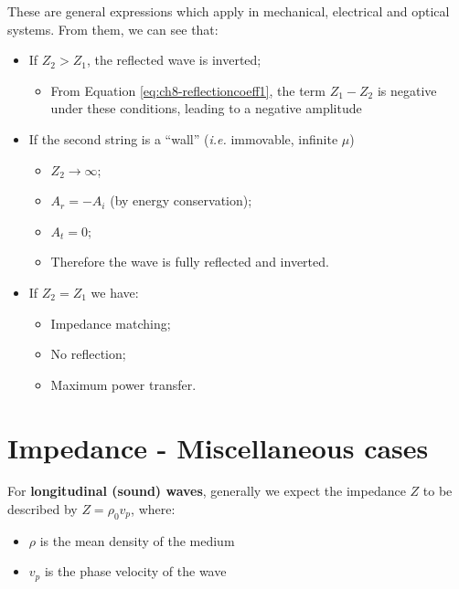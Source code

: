 \documentclass[
]{book}
\providecommand{\tightlist}{%
  \setlength{\itemsep}{0pt}\setlength{\parskip}{0pt}}
\begin{document}
These are general expressions which apply in mechanical, electrical and optical systems. From them, we can see that:

\begin{itemize}
\tightlist
\item
  If \(Z_2 > Z_1\), the reflected wave is inverted;

  \begin{itemize}
  \tightlist
  \item
    From Equation \eqref{eq:ch8-reflectioncoeff1}, the term \(Z_1 - Z_2\) is negative under these conditions, leading to a negative amplitude
  \end{itemize}
\item
  If the second string is a ``wall'' (\emph{i.e.} immovable, infinite \(\mu\))

  \begin{itemize}
  \tightlist
  \item
    \(Z_2 \rightarrow \infty\);
  \item
    \(A_r = - A_i\) (by energy conservation);
  \item
    \(A_t = 0\);
  \item
    Therefore the wave is fully reflected and inverted.
  \end{itemize}
\item
  If \(Z_2 = Z_1\) we have:

  \begin{itemize}
  \tightlist
  \item
    Impedance matching;
  \item
    No reflection;
  \item
    Maximum power transfer.
  \end{itemize}
\end{itemize}

\hypertarget{sec-ch8-impedancemisccases}{%
\section{Impedance - Miscellaneous cases}\label{sec-ch8-impedancemisccases}}

For \textbf{longitudinal (sound) waves}, generally we expect the impedance \(Z\) to be described by \(Z = \rho_0 v_p\), where:

\begin{itemize}
\tightlist
\item
  \(\rho\) is the mean density of the medium
\item
  \(v_p\) is the phase velocity of the wave
\end{itemize}
\end{document}
